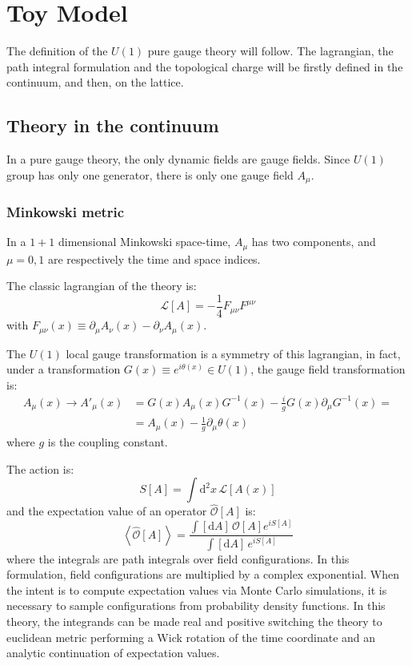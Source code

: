 \chapter{Toy Model}\label{ch:toy_model}

The definition of the $U(1)$ pure gauge theory will follow.
The lagrangian, the path integral formulation and the topological charge will be firstly defined in the continuum, and then, on the lattice.

\section{Theory in the continuum}

In a pure gauge theory, the only dynamic fields are gauge fields.
Since $U(1)$ group has only one generator, there is only one gauge field $A_\mu$.

\subsection*{Minkowski metric}

In a $1+1$ dimensional Minkowski space-time, $A_\mu$ has two components, and $\mu = 0, 1$ are respectively the time and space indices.

The classic lagrangian of the theory is:
\[
    \mathcal L[A] = -\frac{1}{4} F_{\mu\nu}F^{\mu\nu}
\]
with $F_{\mu\nu}(x) \equiv \partial_\mu A_\nu(x) - \partial_\nu A_\mu(x)$.

The $U(1)$ local gauge transformation is a symmetry of this lagrangian, in fact,
under a transformation $G(x) \equiv e^{i\theta(x)} \in U(1)$,
the gauge field transformation is:
\begin{align*}
    A_\mu(x) \rightarrow A'_\mu(x) &= G(x) A_\mu(x) G^{-1}(x) - \frac{i}{g} G(x) \partial_\mu G^{-1}(x) = \\
                                   &= A_\mu(x) - \frac{1}{g} \partial_\mu \theta(x)
\end{align*}
where $g$ is the coupling constant.

The action is: \[ S[A] = \int \mathrm d^2x\, \mathcal L[A(x)] \] and the expectation value of an operator $\widehat{\mathcal O}[A]$ is:
\[
    \left< \widehat{\mathcal O}[A] \right> = \frac{\int[\mathrm dA]\, \mathcal O[A] e^{iS[A]}}{\int[\mathrm dA]\,e^{iS[A]}}
\]
where the integrals are path integrals over field configurations.
In this formulation, field configurations are multiplied by a complex exponential.
When the intent is to compute expectation values via Monte Carlo simulations,
it is necessary to sample configurations from probability density functions.
In this theory, the integrands can be made real and positive switching the theory to euclidean metric performing a Wick rotation of the time coordinate and an analytic continuation of expectation values.

